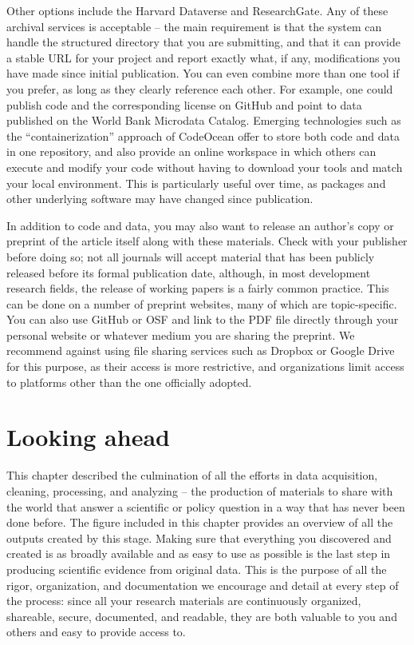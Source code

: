 Other options include the Harvard Dataverse
and ResearchGate.
Any of these archival services is acceptable --
the main requirement is that the system can handle
the structured directory that you are submitting,
and that it can provide a stable URL for your project
and report exactly what, if any,
modifications you have made since initial publication.
You can even combine more than one tool if you prefer,
as long as they clearly reference each other.
For example, one could publish code and the corresponding license on GitHub
and point to data published on the World Bank Microdata Catalog.
Emerging technologies such as the ``containerization'' approach of CodeOcean
offer to store both code and data in one repository,
and also provide an online workspace in which others can execute and modify your code
without having to download your tools and match your local environment.
This is particularly useful over time, as packages and other underlying software may have changed since publication.

In addition to code and data,
you may also want to release an author's copy or preprint
of the article itself along with these materials.
Check with your publisher before doing so;
not all journals will accept material that has been publicly released
before its formal publication date, although,
in most development research fields,
the release of working papers is a fairly common practice.
This can be done on a number of preprint websites,
many of which are topic-specific.
You can also use GitHub or OSF and link to the PDF file directly
through your personal website or whatever medium you are sharing the preprint.
We recommend against using file sharing services such as
Dropbox or Google Drive for this purpose,
as their access is more restrictive,
and organizations limit access to platforms other than the one officially adopted.

\section{Looking ahead}
This chapter described the culmination of all the efforts in data acquisition, cleaning, processing, and analyzing --
the production of materials to share with the world
that answer a scientific or policy question in a way that has
never been done before.
The figure included in this chapter provides an overview
of all the outputs created by this stage.
Making sure that everything you discovered and created
is as broadly available and as easy to use as possible
is the last step in producing scientific evidence from original data.
This is the purpose of all the rigor, organization, and documentation
we encourage and detail at every step of the process:
since all your research materials are
continuously organized, shareable, secure, documented, and readable,
they are both valuable to you and others and easy to provide access to.

